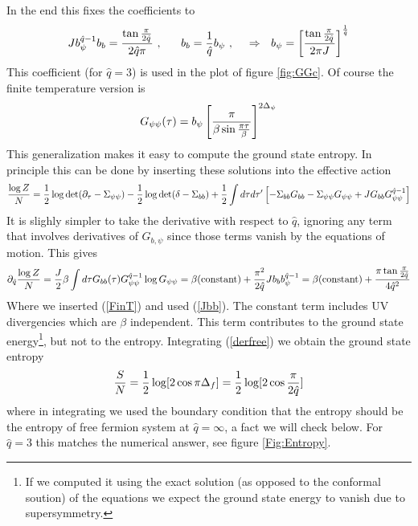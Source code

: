 \documentclass[aps,pre,preprint,onecolumn,citeautoscript,superscriptaddress,nofootinbib,eqsecnum]{revtex4-1}
\def\nref#1{(\ref{#1})}
\def\be{\begin{equation}}
\def\ee{\end{equation}}
\def\half{{1 \over 2 }}
\def\la{\label}
\begin{document}
In the end this fixes the coefficients to 
\be \la{Jbb}
J b_\psi^{ \hat q -1} b_b = { \tan{ \pi \over 2 \hat q } \over 2 \hat q \pi } ~,~~~~~b_b= { 1 \over \hat q } b_\psi ~,~~~~\Rightarrow ~~ 
b_\psi = \left[ {\tan{ \pi \over 2 \hat q } \over 2 \pi J }\right]^{ 1 \over \hat q } 
 \ee
 This coefficient (for $\hat q=3$) is used in the plot of figure \ref{fig:GGc}.
Of course the finite temperature version is 
\be \la{FinT} 
G_{\psi \psi} (\tau) = b_\psi \left[ \pi \over \beta \sin{ \pi \tau \over \beta } \right]^{2 \Delta_\psi}  
\ee
This generalization makes it easy to compute the ground state entropy. In principle this can be done by inserting these solutions into the 
effective action 
\be
{ \log Z \over N } = { 1 \over 2 } \log \det ( \partial_\tau - \Sigma_{\psi \psi}) - { 1 \over 2 } \log \det  ( \delta - \Sigma_{bb} ) 
+ { 1 \over 2 } \int d\tau d\tau' \left[ - \Sigma_{bb} G_{bb} - \Sigma_{\psi \psi} G_{\psi \psi}+ { J    }  G_{bb} G_{\psi \psi}^{\hat q -1 }  \right]
\ee
It is slighly simpler to take the derivative with respect to $\hat q$, ignoring any term that involves derivatives of $G_{b,\psi}$ since those terms vanish
by the equations of motion. This gives 
\be \la{derfree}
\partial_{\hat q } { \log Z \over N } =   {   J  \over 2 } \beta \int d\tau G_{bb}(\tau) G_{\psi \psi}^{\hat q -1 } \log G_{\psi \psi} =  
 \beta ( {\rm constant} )  +  {  \pi^2  \over 2 \hat q } {   J b_b b_\psi^{ \hat q -1}    }  = \beta ( { \rm constant} ) + { \pi \tan { \pi \over 2 \hat q } \over 4 \hat q^2 } 
\ee
Where we inserted  \nref{FinT} and used \nref{Jbb}. 
The constant term includes UV divergencies which are $\beta$ independent. This term contributes   to the ground state energy\footnote{If we computed it using the 
exact solution (as opposed to the conformal soution) of the equations we expect the ground state energy  to vanish due to supersymmetry.},  but
  not   to the
entropy.  
Integrating \nref{derfree} we obtain the ground state entropy 
\be \la{GSEntropy}
{ S \over N } = \half \log[ 2 \cos \pi \Delta_f] = \half \log[ 2 \cos { \pi \over 2 \hat q } ] 
\ee
where in integrating we used the boundary condition that the entropy should be the entropy of free fermion system at $\hat q =\infty$, a fact we will check below. 
For $\hat q=3$ this matches the numerical answer, see figure \ref{Fig:Entropy}. 

\end{document}
